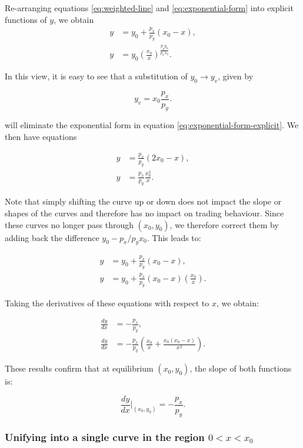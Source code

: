 \documentclass{article}
\begin{document}
Re-arranging equations \eqref{eq:weighted-line} and \eqref{eq:exponential-form} into explicit functions of $y$, we obtain
\begin{align}
    \label{eq:weighted-line-explicit}
    y &= y_0 + \frac{p_x}{ p_y} (x_0 - x), \\
    \label{eq:exponential-form-explicit}
    y &= y_0 \left( \frac{x_0}{x} \right)^{\frac{p_y y_0}{p_x x_0}}.
\end{align}

In this view, it is easy to see that a substitution of $y_0 \rightarrow y_v$, given by

\[
y_v = x_0 \frac{p_x}{p_y}.
\]

will eliminate the exponential form in equation \eqref{eq:exponential-form-explicit}. We then have equations

\begin{align}
    y &= \frac{p_x}{p_y} (2x_0 - x), \\
    y &= \frac{p_x}{p_y} \frac{x_0^2}{x}.
\end{align}

Note that simply shifting the curve up or down does not impact the slope or shapes of the curves and therefore has no impact on trading behaviour. Since these curves no longer pass through \( (x_0, y_0) \), we therefore correct them by adding back the difference \( y_0 - p_x / p_y x_0 \). This leads to:

\begin{align}
    y &= y_0 + \frac{p_x}{p_y} (x_0 - x), \\
    y &= y_0 + \frac{p_x}{p_y} (x_0 - x) \left( \frac{x_0}{x} \right).
\end{align}

Taking the derivatives of these equations with respect to $x$, we obtain:

\begin{align}
    \frac{dy}{dx} &= -\frac{p_x}{p_y}, \\
    \frac{dy}{dx} &= -\frac{p_x}{p_y} \left( \frac{x_0}{x} + \frac{x_0(x_0 - x)}{x^2} \right).
\end{align}

These results confirm that at equilibrium $(x_0, y_0)$, the slope of both functions is:

\[
\frac{dy}{dx} \Big|_{(x_0, y_0)} = -\frac{p_x}{p_y}.
\]

\subsubsection{Unifying into a single curve in the region $0 < x < x_0$}
\end{document}
